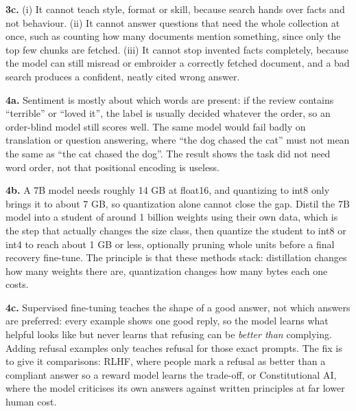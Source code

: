 \documentclass[11pt]{article}
\begin{document}
\textbf{3c.} (i) It cannot teach style, format or skill, because search hands over facts and
not behaviour. (ii) It cannot answer questions that need the whole collection at once, such as
counting how many documents mention something, since only the top few chunks are fetched.
(iii) It cannot stop invented facts completely, because the model can still misread or
embroider a correctly fetched document, and a bad search produces a confident, neatly cited
wrong answer.

\textbf{4a.} Sentiment is mostly about which words are present: if the review contains
``terrible'' or ``loved it'', the label is usually decided whatever the order, so an
order-blind model still scores well. The same model would fail badly on translation or
question answering, where ``the dog chased the cat'' must not mean the same as ``the cat
chased the dog''. The result shows the task did not need word order, not that positional
encoding is useless.

\textbf{4b.} A 7B model needs roughly 14 GB at float16, and quantizing to int8 only brings it
to about 7 GB, so quantization alone cannot close the gap. Distil the 7B model into a student
of around 1 billion weights using their own data, which is the step that actually changes the
size class, then quantize the student to int8 or int4 to reach about 1 GB or less, optionally
pruning whole units before a final recovery fine-tune. The principle is that these methods
stack: distillation changes how many weights there are, quantization changes how many bytes
each one costs.

\textbf{4c.} Supervised fine-tuning teaches the shape of a good answer, not which answers are
preferred: every example shows one good reply, so the model learns what helpful looks like but
never learns that refusing can be \emph{better than} complying. Adding refusal examples only
teaches refusal for those exact prompts. The fix is to give it comparisons: RLHF, where people
mark a refusal as better than a compliant answer so a reward model learns the trade-off, or
Constitutional AI, where the model criticises its own answers against written principles at
far lower human cost.
\end{document}
